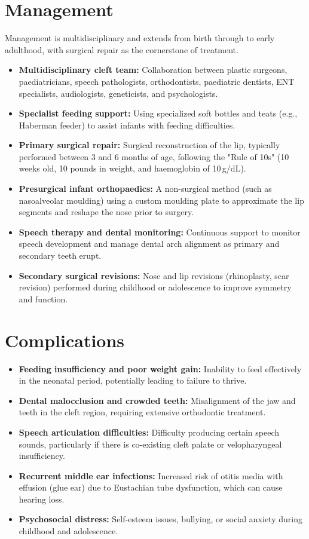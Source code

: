 \section*{Management}
Management is multidisciplinary and extends from birth through to early adulthood, with surgical repair as the cornerstone of treatment.
\begin{itemize}
    \item \textbf{Multidisciplinary cleft team:} Collaboration between plastic surgeons, paediatricians, speech pathologists, orthodontists, paediatric dentists, ENT specialists, audiologists, geneticists, and psychologists.
    \item \textbf{Specialist feeding support:} Using specialized soft bottles and teats (e.g., Haberman feeder) to assist infants with feeding difficulties.
    \item \textbf{Primary surgical repair:} Surgical reconstruction of the lip, typically performed between 3 and 6 months of age, following the "Rule of 10s" (10 weeks old, 10 pounds in weight, and haemoglobin of 10\,g/dL).
    \item \textbf{Presurgical infant orthopaedics:} A non-surgical method (such as nasoalveolar moulding) using a custom moulding plate to approximate the lip segments and reshape the nose prior to surgery.
    \item \textbf{Speech therapy and dental monitoring:} Continuous support to monitor speech development and manage dental arch alignment as primary and secondary teeth erupt.
    \item \textbf{Secondary surgical revisions:} Nose and lip revisions (rhinoplasty, scar revision) performed during childhood or adolescence to improve symmetry and function.
\end{itemize}

\section*{Complications}
\begin{itemize}
    \item \textbf{Feeding insufficiency and poor weight gain:} Inability to feed effectively in the neonatal period, potentially leading to failure to thrive.
    \item \textbf{Dental malocclusion and crowded teeth:} Misalignment of the jaw and teeth in the cleft region, requiring extensive orthodontic treatment.
    \item \textbf{Speech articulation difficulties:} Difficulty producing certain speech sounds, particularly if there is co-existing cleft palate or velopharyngeal insufficiency.
    \item \textbf{Recurrent middle ear infections:} Increased risk of otitis media with effusion (glue ear) due to Eustachian tube dysfunction, which can cause hearing loss.
    \item \textbf{Psychosocial distress:} Self-esteem issues, bullying, or social anxiety during childhood and adolescence.
\end{itemize}

